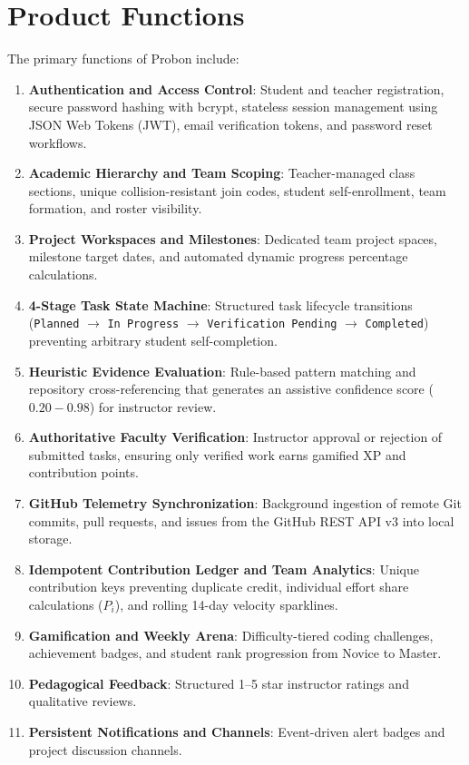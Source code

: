 \documentclass{scrreprt}
\begin{document}
\section{Product Functions}\label{sec:product_functions}
The primary functions of Probon include:
\begin{enumerate}
    \item \textbf{Authentication and Access Control}: Student and teacher registration, secure password hashing with bcrypt, stateless session management using JSON Web Tokens (JWT), email verification tokens, and password reset workflows.
    \item \textbf{Academic Hierarchy and Team Scoping}: Teacher-managed class sections, unique collision-resistant join codes, student self-enrollment, team formation, and roster visibility.
    \item \textbf{Project Workspaces and Milestones}: Dedicated team project spaces, milestone target dates, and automated dynamic progress percentage calculations.
    \item \textbf{4-Stage Task State Machine}: Structured task lifecycle transitions (\texttt{Planned} $\rightarrow$ \texttt{In Progress} $\rightarrow$ \texttt{Verification Pending} $\rightarrow$ \texttt{Completed}) preventing arbitrary student self-completion.
    \item \textbf{Heuristic Evidence Evaluation}: Rule-based pattern matching and repository cross-referencing that generates an assistive confidence score ($0.20 - 0.98$) for instructor review.
    \item \textbf{Authoritative Faculty Verification}: Instructor approval or rejection of submitted tasks, ensuring only verified work earns gamified XP and contribution points.
    \item \textbf{GitHub Telemetry Synchronization}: Background ingestion of remote Git commits, pull requests, and issues from the GitHub REST API v3 into local storage.
    \item \textbf{Idempotent Contribution Ledger and Team Analytics}: Unique contribution keys preventing duplicate credit, individual effort share calculations ($P_i$), and rolling 14-day velocity sparklines.
    \item \textbf{Gamification and Weekly Arena}: Difficulty-tiered coding challenges, achievement badges, and student rank progression from Novice to Master.
    \item \textbf{Pedagogical Feedback}: Structured 1--5 star instructor ratings and qualitative reviews.
    \item \textbf{Persistent Notifications and Channels}: Event-driven alert badges and project discussion channels.
\end{enumerate}
\end{document}
